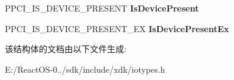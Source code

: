 \begin{DoxyCompactItemize}
\mbox{\label{struct___p_c_i___d_e_v_i_c_e___p_r_e_s_e_n_t___i_n_t_e_r_f_a_c_e_ad501c3429f5cf733df7accffbff4a4c0}} 
P\+P\+C\+I\+\_\+\+I\+S\+\_\+\+D\+E\+V\+I\+C\+E\+\_\+\+P\+R\+E\+S\+E\+NT {\bfseries Is\+Device\+Present}
\item 
\mbox{\label{struct___p_c_i___d_e_v_i_c_e___p_r_e_s_e_n_t___i_n_t_e_r_f_a_c_e_a8ec0bcf3a99f7d9fc3fc382c69add8aa}} 
P\+P\+C\+I\+\_\+\+I\+S\+\_\+\+D\+E\+V\+I\+C\+E\+\_\+\+P\+R\+E\+S\+E\+N\+T\+\_\+\+EX {\bfseries Is\+Device\+Present\+Ex}
\end{DoxyCompactItemize}


该结构体的文档由以下文件生成\+:\begin{DoxyCompactItemize}
\item 
E\+:/\+React\+O\+S-\/0../sdk/include/xdk/iotypes.\+h\end{DoxyCompactItemize}
